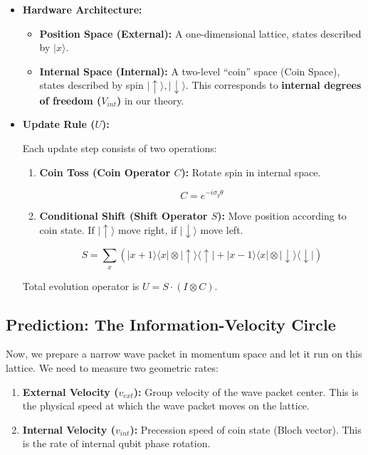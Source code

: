 \begin{itemize}
\item \textbf{Hardware Architecture:}

  \begin{itemize}
  \item \textbf{Position Space (External):} A one-dimensional lattice, states described by $|x\rangle$.

  \item \textbf{Internal Space (Internal):} A two-level ``coin'' space (Coin Space), states described by spin $| \uparrow \rangle, | \downarrow \rangle$. This corresponds to \textbf{internal degrees of freedom ($V_{int}$)} in our theory.
  \end{itemize}

\item \textbf{Update Rule ($U$):}

  Each update step consists of two operations:

  \begin{enumerate}
  \item \textbf{Coin Toss (Coin Operator $C$):} Rotate spin in internal space.

     $$C = e^{-i \sigma_y \theta}$$

  \item \textbf{Conditional Shift (Shift Operator $S$):} Move position according to coin state. If $| \uparrow \rangle$ move right, if $| \downarrow \rangle$ move left.

     $$S = \sum_x (|x+1\rangle\langle x| \otimes |\uparrow\rangle\langle\uparrow| + |x-1\rangle\langle x| \otimes |\downarrow\rangle\langle\downarrow|)$$
  \end{enumerate}

  Total evolution operator is $U = S \cdot (I \otimes C)$.
\end{itemize}

\subsection{Prediction: The Information-Velocity Circle}

Now, we prepare a narrow wave packet in momentum space and let it run on this lattice. We need to measure two geometric rates:

\begin{enumerate}
\item \textbf{External Velocity ($v_{ext}$):} Group velocity of the wave packet center. This is the physical speed at which the wave packet moves on the lattice.

\item \textbf{Internal Velocity ($v_{int}$):} Precession speed of coin state (Bloch vector). This is the rate of internal qubit phase rotation.
\end{enumerate}

